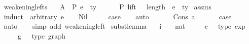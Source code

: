 \begin{isabellebody}
\isamarkupfalse%
\ weakening{\isacharunderscore}{\kern0pt}lefts{\isacharcolon}{\kern0pt}\isanewline
\ \ \ A{}{\isacharcolon}{\kern0pt}\ {\isachardoublequoteopen}{\isasymGamma}\ {\isasymturnstile}{\isacharbraceleft}{\kern0pt}P{\isacharbraceright}{\kern0pt}\ e\ {\isacharcolon}{\kern0pt}\ ty{\isachardoublequoteclose}\isanewline
\ \ \ {\isachardoublequoteopen}{\isasymGamma}{}\ {\isacharat}{\kern0pt}\ {\isasymGamma}\ {\isasymturnstile}{\isacharbraceleft}{\kern0pt}P{\isacharbraceright}{\kern0pt}\ {\isacharparenleft}{\kern0pt}lift\ {}\ {\isacharcircum}{\kern0pt}{\isacharcircum}{\kern0pt}\ length\ {\isasymGamma}{}{\isacharparenright}{\kern0pt}\ e\ {\isacharcolon}{\kern0pt}\ ty{\isachardoublequoteclose}\isanewline
%
\isadelimproof
%
\endisadelimproof
%
\isatagproof
{}\isamarkupfalse%
\ assms\isanewline
{}\isamarkupfalse%
\ {\isacharparenleft}{\kern0pt}induct\ {\isasymGamma}{}\ arbitrary{\isacharcolon}{\kern0pt}\ e{\isacharparenright}{\kern0pt}\isanewline
\ \ \isamarkupfalse%
\ Nil\isanewline
\ \ \isamarkupfalse%
\ \isamarkupfalse%
\ {\isacharquery}{\kern0pt}case\isanewline
\ \ \isamarkupfalse%
\ auto\isanewline
\ \ \isamarkupfalse%
\isanewline
{}\isamarkupfalse%
\isanewline
\ \ \isamarkupfalse%
\ {\isacharparenleft}{\kern0pt}Cons\ a\ {\isasymGamma}{}{\isacharparenright}{\kern0pt}\isanewline
\ \ \isamarkupfalse%
\ \isamarkupfalse%
\ {\isacharquery}{\kern0pt}case\isanewline
\ \ \isamarkupfalse%
\ auto\isanewline
\ \ \isamarkupfalse%
\ {\isacharparenleft}{\kern0pt}simp\ add{\isacharcolon}{\kern0pt}\ weakening{\isacharunderscore}{\kern0pt}left{\isacharparenright}{\kern0pt}\isanewline
{}\isamarkupfalse%
%
\endisatagproof
{\isafoldproof}%
%
\isadelimproof
\isanewline
%
\endisadelimproof
\isanewline
\isanewline
{}\isamarkupfalse%
\ subst{\isacharunderscore}{\kern0pt}lemma{\isacharcolon}{\kern0pt}\isanewline
\ \ \ i\ \ \ {\isacharcolon}{\kern0pt}{\isacharcolon}{\kern0pt}\ nat\isanewline
\ \ \ \ \ e{}\ \ {\isacharcolon}{\kern0pt}{\isacharcolon}{\kern0pt}\ {\isachardoublequoteopen}type\ exp{\isachardoublequoteclose}\isanewline
\ \ \ \ \ g{}\ \ {\isacharcolon}{\kern0pt}{\isacharcolon}{\kern0pt}\ {\isachardoublequoteopen}type\ graph{\isachardoublequoteclose}\isanewline

\end{isabellebody}
